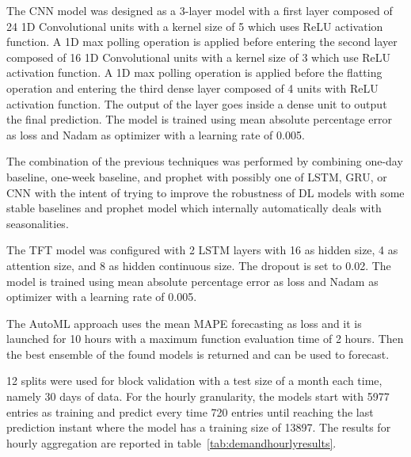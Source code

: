 The CNN model was designed as a 3-layer model with a first layer composed of 24 1D Convolutional units with a kernel size of 5 which uses ReLU activation function.
A 1D max polling operation is applied before entering the second layer composed of 16 1D Convolutional units with a kernel size of 3 which use ReLU activation function.
A 1D max polling operation is applied before the flatting operation and entering the third dense layer composed of 4 units with ReLU activation function.
The output of the layer goes inside a dense unit to output the final prediction.
The model is trained using mean absolute percentage error as loss and Nadam as optimizer with a learning rate of 0.005.

The combination of the previous techniques was performed by combining one-day baseline, one-week baseline, and prophet with possibly one of LSTM, GRU, or CNN with the intent of trying to improve the robustness of DL models with some stable baselines and prophet model which internally automatically deals with seasonalities.

The TFT model was configured with 2 LSTM layers with 16 as hidden size, 4 as attention size, and 8 as hidden continuous size.
The dropout is set to 0.02.
The model is trained using mean absolute percentage error as loss and Nadam as optimizer with a learning rate of 0.005.

The AutoML approach uses the mean MAPE forecasting as loss and it is launched for 10 hours with a maximum function evaluation time of 2 hours.
Then the best ensemble of the found models is returned and can be used to forecast.

12 splits were used for block validation with a test size of a month each time, namely 30 days of data.
For the hourly granularity, the models start with 5977 entries as training and predict every time 720 entries until reaching the last prediction instant where the model has a training size of 13897.
The results for hourly aggregation are reported in table~\ref{tab:demandhourlyresults}.

